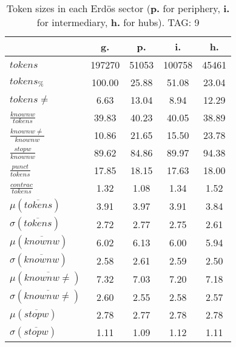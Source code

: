 \begin{table}[h!]
\begin{center}
\begin{tabular}{| l || c | c | c | c |}\hline
 & {\bf g.} & {\bf p.} & {\bf i.} & {\bf h.} \\\hline\hline
$tokens$ & 197270  & 51053  & 100758  & 45461 \\
$tokens_{\%}$ & 100.00  & 25.88  & 51.08  & 23.04 \\
$tokens \neq$ & 6.63  & 13.04  & 8.94  & 12.29 \\\hline
$\frac{knownw}{tokens}$ & 39.83  & 40.23  & 40.05  & 38.89 \\
$\frac{knownw \neq}{knownw}$ & 10.86  & 21.65  & 15.50  & 23.78 \\\hline
$\frac{stopw}{knownw}$ & 89.62  & 84.86  & 89.97  & 94.38 \\
$\frac{punct}{tokens}$ & 17.85  & 18.15  & 17.63  & 18.00 \\
$\frac{contrac}{tokens}$ & 1.32  & 1.08  & 1.34  & 1.52 \\\hline\hline
$\mu(\overline{tokens})$ & 3.91  & 3.97  & 3.91  & 3.84 \\
$\sigma(\overline{tokens})$ & 2.72  & 2.77  & 2.75  & 2.61 \\\hline
$\mu(\overline{knownw})$ & 6.02  & 6.13  & 6.00  & 5.94 \\
$\sigma(\overline{knownw})$ & 2.58  & 2.61  & 2.59  & 2.50 \\\hline
$\mu(\overline{knownw \neq})$ & 7.32  & 7.03  & 7.20  & 7.18 \\
$\sigma(\overline{knownw \neq})$ & 2.60  & 2.55  & 2.58  & 2.57 \\\hline
$\mu(\overline{stopw})$ & 2.78  & 2.77  & 2.78  & 2.78 \\
$\sigma(\overline{stopw})$ & 1.11  & 1.09  & 1.12  & 1.11 \\\hline
\end{tabular}
\caption{Token sizes in each Erd\"os sector ({{\bf p.}} for periphery, {{\bf i.}} for intermediary, {{\bf h.}} for hubs). TAG: 9}
\end{center}
\end{table}